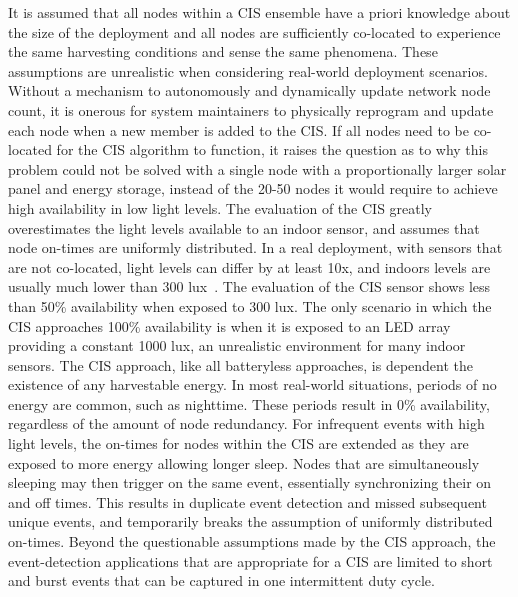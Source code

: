 It is assumed that all nodes within a CIS ensemble have a priori knowledge about the size of the deployment and all nodes are sufficiently co-located to experience the same harvesting conditions and sense the same phenomena. 
These assumptions are unrealistic when considering real-world deployment scenarios. 
Without a mechanism to autonomously and dynamically update network node count, it is onerous for system maintainers to physically reprogram and update each node when a new member is added to the CIS.
If all nodes need to be co-located for the CIS algorithm to function, it raises the question as to why this problem could not be solved with a single node with a proportionally larger solar panel and energy storage, instead of the 20-50 nodes it would require to achieve high availability in low light levels.
The evaluation of the CIS greatly overestimates the light levels available to an indoor sensor, 
and assumes that node on-times are uniformly distributed. 
In a real deployment, with sensors that are not co-located, light levels can differ by at least 10x,
and indoors levels are usually much lower than 300 lux~\cite{yervaGrafting12}.
The evaluation of the CIS sensor shows less than 50\% availability when exposed to 300 lux. The only scenario in which the CIS approaches 100\% availability is when it is exposed to an LED array providing a constant 1000 lux, an unrealistic environment for many indoor sensors. 
The CIS approach, like all batteryless approaches, is dependent the existence of any harvestable energy.
In most real-world situations, periods of no energy are common, such as nighttime. These periods result in 0\% availability, regardless of the amount of node redundancy.
For infrequent events with high light levels, the on-times for nodes within the CIS are extended as they are exposed to more energy allowing longer sleep. Nodes that are simultaneously sleeping may then trigger on the same event, essentially synchronizing their on and off times. This results in duplicate event detection and missed subsequent unique events, and temporarily breaks the assumption of uniformly distributed on-times.
Beyond the questionable assumptions made by the CIS approach, the event-detection applications that are appropriate for a CIS are limited to short and burst events that can be captured in one intermittent duty cycle.

